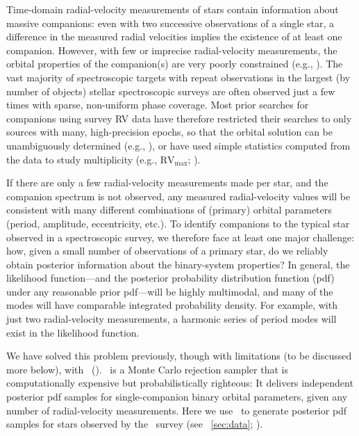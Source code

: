 \documentclass[modern, letterpaper]{aastex62}
\newcommand{\apogee}{\project{\acronym{APOGEE}}}
\newcommand{\thejoker}{\project{The~Joker}}
\begin{document}
Time-domain radial-velocity measurements of stars contain information about
massive companions: even with two successive observations of a single star, a
difference in the measured radial velocities implies the existence of at least
one companion.
However, with few or imprecise radial-velocity measurements, the orbital
properties of the companion(s) are very poorly constrained (e.g.,
\citealt{Price-Whelan:2017}).
The vast majority of spectroscopic targets with repeat observations in the
largest (by number of objects) stellar spectroscopic surveys are often observed
just a few times with sparse, non-uniform phase coverage.
Most prior searches for companions using survey RV data have therefore
restricted their searches to only sources with many, high-precision epochs, so
that the orbital solution can be unambiguously determined (e.g.,
\citealt{Troup:2016}), or have used simple statistics computed from the data to
study multiplicity (e.g., $\textrm{RV}_\textrm{max}$; \citealt{Badenes:2017}).

If there are only a few radial-velocity measurements made per star, and the
companion spectrum is not observed, any measured radial-velocity values will be
consistent with many different combinations of (primary) orbital parameters
(period, amplitude, eccentricity, etc.).
To identify companions to the typical star observed in a spectroscopic survey,
we therefore face at least one major challenge: how, given a small number of
observations of a primary star, do we reliably obtain posterior information
about the binary-system properties?
In general, the likelihood function---and the posterior probability distribution
function (pdf) under any reasonable prior pdf---will be highly multimodal, and
many of the modes will have comparable integrated probability density.
For example, with just two radial-velocity measurements, a harmonic series of
period modes will exist in the likelihood function.

We have solved this problem previously, though with limitations (to be discussed
more below), with \thejoker\ (\citealt{Price-Whelan:2017}).
\thejoker\ is a Monte Carlo rejection sampler that is computationally expensive
but probabilistically righteous:
It delivers independent posterior pdf samples for single-companion binary
orbital parameters, given any number of radial-velocity measurements.
Here we use \thejoker\ to generate posterior pdf samples for stars observed by
the \apogee\ survey (see \sectionname~\ref{sec:data}; \citealt{Majewski:2017}).
\end{document}
